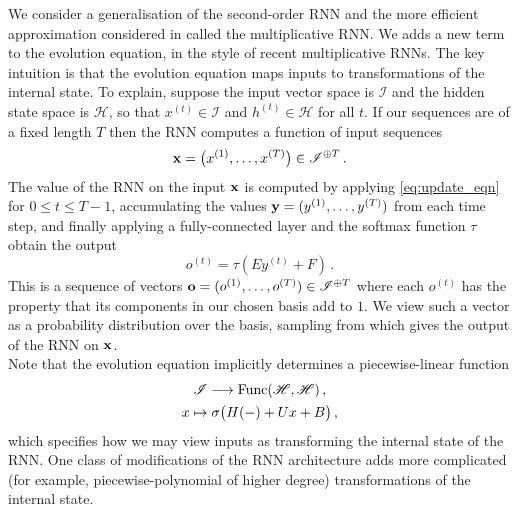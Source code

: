 \documentclass[english,letter paper,12pt,leqno]{article}
\theoremstyle{example}
\numberwithin{equation}{section}
\begin{document}
We consider a generalisation of the second-order RNN \cite{highorderrec,pollack,firstvsecond,secondorder} and the more efficient approximation considered in \cite{yuhai,irsoy} called the multiplicative RNN. We adds a new term to the evolution equation, in the style of recent multiplicative RNNs. The key intuition is that the evolution equation maps inputs to transformations of the internal state. To explain, suppose the input vector space is $\mathscr{I}$ and the hidden state space is $\mathscr{H}$, so that $x^{(t)} \in \mathscr{I}$ and $h^{(t)} \in \mathscr{H}$ for all $t$. If our sequences are of a fixed length $T$ then the RNN computes a function of input sequences
\[
\bold{x} = \big( x^{(1)}, \ldots, x^{(T)} \big) \in \mathscr{I}^{\oplus T}\,.
\]
The value of the RNN on the input $\bold{x}$ is computed by applying \eqref{eq:update_eqn} for $0 \le t \le T - 1$, accumulating the values $\bold{y} = (y^{(1)}, \ldots, y^{(T)})$ from each time step, and finally applying a fully-connected layer and the softmax function $\tau$ obtain the output
\[
o^{(t)} = \tau( E y^{(t)} + F )\,.
\]
This is a sequence of vectors $\bold{o} = (o^{(1)},\ldots,o^{(T)}) \in \mathscr{I}^{\oplus T}$ where each $o^{(t)}$ has the property that its components in our chosen basis add to $1$. We view such a vector as a probability distribution over the basis, sampling from which gives the output of the RNN on $\bold{x}$.
\\

Note that the evolution equation implicitly determines a piecewise-linear function
\begin{gather*}
\mathscr{I} \longrightarrow \operatorname{Func}(\mathscr{H}, \mathscr{H} )\,,\\
x \mapsto \sigma\big( H (-) + U x + B\big)\,,
\end{gather*}
which specifies how we may view inputs as transforming the internal state of the RNN. One class of modifications of the RNN architecture adds more complicated (for example, piecewise-polynomial of higher degree) transformations of the internal state.
\end{document}
